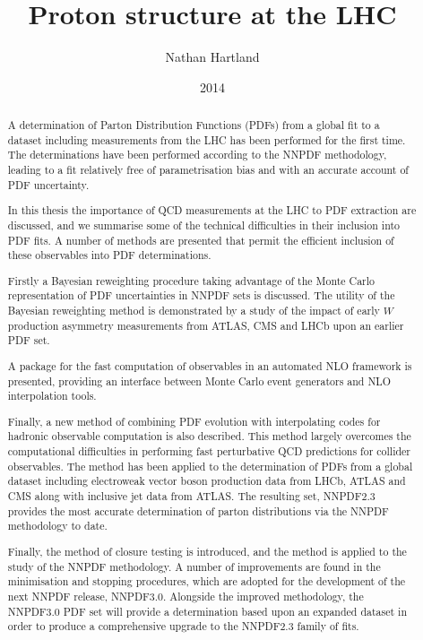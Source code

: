 \documentclass[12pt,twoside,openright]{report}
\title{Proton structure at the LHC}
\author{Nathan Hartland}
\date{2014}
\begin{document}
\maketitle
\setcounter{page}{1}
\dedication{To my parents}
\declaration

\acknowledgements

\begin{spacing}{1.5}

\begin{abstract}
A determination of Parton Distribution Functions (PDFs) from a global fit to a dataset including measurements from the LHC has been performed for the first time. The determinations
have been performed according to the NNPDF methodology, leading to a fit relatively free of parametrisation bias and with an accurate account of PDF uncertainty.

In this thesis the importance of QCD measurements at the LHC to PDF extraction are discussed, and we summarise some of the technical difficulties in their inclusion into PDF fits. A number of methods are presented that permit the efficient inclusion of these observables
into PDF determinations. 

Firstly a Bayesian reweighting procedure taking advantage of the Monte Carlo representation of PDF uncertainties in NNPDF sets is discussed. The utility of the Bayesian reweighting method is demonstrated by a study of the impact of early $W$ production asymmetry measurements from ATLAS, CMS and LHCb upon an earlier PDF set.

A package for the fast computation of observables in an automated NLO framework is presented, providing an interface between Monte Carlo event generators and NLO interpolation tools.

Finally, a new method of combining PDF evolution with interpolating codes for hadronic observable computation is also described. This method largely overcomes the computational difficulties in performing fast perturbative QCD predictions for collider observables. The method has been applied to the determination of PDFs from a global dataset including electroweak vector boson production data from LHCb, ATLAS and CMS along with inclusive jet data from ATLAS. The resulting set, NNPDF2.3 provides the most accurate determination of parton distributions via the NNPDF methodology to date.

Finally, the method of closure testing is introduced, and the method is applied to the study of the NNPDF methodology. A number of improvements are found in the minimisation and stopping procedures, which are adopted for the development of the next NNPDF release, NNPDF3.0. Alongside the improved methodology, the NNPDF3.0 PDF set will provide a determination based upon an expanded dataset in order to produce a comprehensive upgrade to the NNPDF2.3 family of fits.
\vspace{10mm}
\normalsize



\end{abstract}
\end{spacing}
\end{document}
